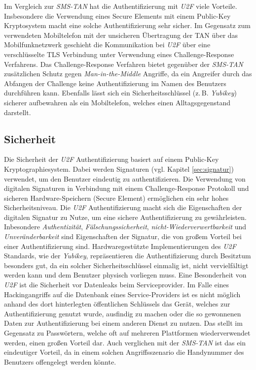 \documentclass[11pt,a4paper,ngerman]{scrreprt}
\begin{document}
Im Vergleich zur \textit{SMS-TAN} hat die Authentifizierung mit \textit{U2F} viele Vorteile. Insbesondere die Verwendung eines Secure Elements mit einem Public-Key Kryptosystem macht eine solche Authentifizierung sehr sicher. Im Gegensatz zum verwendeten Mobiltelefon mit der unsicheren Übertragung der TAN über das Mobilfunknetzwerk geschieht die Kommunikation bei \textit{U2F} über eine verschlüsselte TLS Verbindung unter Verwendung eines Challenge-Response Verfahrens. Das Challenge-Response Verfahren bietet gegenüber der \textit{SMS-TAN} zusätzlichen Schutz gegen \textit{Man-in-the-Middle} Angriffe, da ein Angreifer durch das Abfangen der Challenge keine Authentifizierung im Namen des Benutzers durchführen kann. Ebenfalls lässt sich ein Sicherheitsschlüssel (z.\,B. \textit{Yubikey}) sicherer aufbewahren als ein Mobiltelefon, welches einen Alltagsgegenstand darstellt.
\subsection{Sicherheit}
Die Sicherheit der \textit{U2F} Authentifizierung basiert auf einem Public-Key Kryptographiesystem. Dabei werden Signaturen (vgl. Kapitel \ref{sec:signatur}) verwendet, um den Benutzer eindeutig zu authentifizieren. Die Verwendung von digitalen Signaturen in Verbindung mit einem Challenge-Response Protokoll und sicheren Hardware-Speichern (Secure Element) ermöglichen ein sehr hohes Sicherheitsniveau. Die \textit{U2F} Authentifizierung macht sich die Eigenschaften der digitalen Signatur zu Nutze, um eine sichere Authentifizierung zu gewährleisten. Inbesondere \emph{Authentizität}, \emph{Fälschungssicherheit}, \emph{nicht-Wiederverwertbarkeit} und \emph{Unveränderbarkeit} sind Eigenschaften der Signatur, die von großem Vorteil bei einer Authentifizierung sind. Hardwaregestützte Implementierungen des \textit{U2F} Standards, wie der \textit{Yubikey}, repräsentieren die Authentifizierung durch Besitztum besonders gut, da ein solcher Sicherheitsschlüssel einmalig ist, nicht vervielfältigt werden kann und dem Benutzer physisch vorliegen muss. Eine Besonderheit von \textit{U2F} ist die Sicherheit vor Datenleaks beim Serviceprovider. Im Falle eines Hackingangriffs auf die Datenbank eines Service-Providers ist es nicht möglich anhand des dort hinterlegten öffentlichen Schlüssels das Gerät, welches zur Authentifizierung genutzt wurde, ausfindig zu machen oder die so gewonnenen Daten zur Authentifizierung bei einem anderen Dienst zu nutzen. Das stellt im Gegensatz zu Passwörtern, welche oft auf mehreren Plattformen wiederverwendet werden, einen großen Vorteil dar. Auch verglichen mit der \textit{SMS-TAN} ist das ein eindeutiger Vorteil, da in einem solchen Angriffsszenario die Handynummer des Benutzers offengelegt werden könnte.
\end{document}
